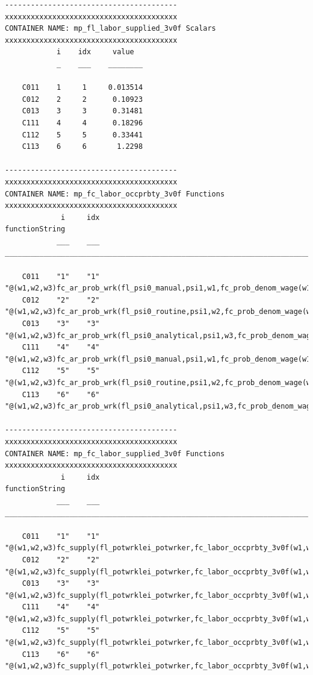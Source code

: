 \documentclass[
]{book}
\begin{document}
\begin{verbatim}
----------------------------------------
xxxxxxxxxxxxxxxxxxxxxxxxxxxxxxxxxxxxxxxx
CONTAINER NAME: mp_fl_labor_supplied_3v0f Scalars
xxxxxxxxxxxxxxxxxxxxxxxxxxxxxxxxxxxxxxxx
            i    idx     value  
            _    ___    ________

    C011    1     1     0.013514
    C012    2     2      0.10923
    C013    3     3      0.31481
    C111    4     4      0.18296
    C112    5     5      0.33441
    C113    6     6       1.2298

----------------------------------------
xxxxxxxxxxxxxxxxxxxxxxxxxxxxxxxxxxxxxxxx
CONTAINER NAME: mp_fc_labor_occprbty_3v0f Functions
xxxxxxxxxxxxxxxxxxxxxxxxxxxxxxxxxxxxxxxx
             i     idx                                       functionString                                   
            ___    ___    ____________________________________________________________________________________

    C011    "1"    "1"    "@(w1,w2,w3)fc_ar_prob_wrk(fl_psi0_manual,psi1,w1,fc_prob_denom_wage(w1,w2,w3))"    
    C012    "2"    "2"    "@(w1,w2,w3)fc_ar_prob_wrk(fl_psi0_routine,psi1,w2,fc_prob_denom_wage(w1,w2,w3))"   
    C013    "3"    "3"    "@(w1,w2,w3)fc_ar_prob_wrk(fl_psi0_analytical,psi1,w3,fc_prob_denom_wage(w1,w2,w3))"
    C111    "4"    "4"    "@(w1,w2,w3)fc_ar_prob_wrk(fl_psi0_manual,psi1,w1,fc_prob_denom_wage(w1,w2,w3))"    
    C112    "5"    "5"    "@(w1,w2,w3)fc_ar_prob_wrk(fl_psi0_routine,psi1,w2,fc_prob_denom_wage(w1,w2,w3))"   
    C113    "6"    "6"    "@(w1,w2,w3)fc_ar_prob_wrk(fl_psi0_analytical,psi1,w3,fc_prob_denom_wage(w1,w2,w3))"

----------------------------------------
xxxxxxxxxxxxxxxxxxxxxxxxxxxxxxxxxxxxxxxx
CONTAINER NAME: mp_fc_labor_supplied_3v0f Functions
xxxxxxxxxxxxxxxxxxxxxxxxxxxxxxxxxxxxxxxx
             i     idx                                    functionString                                
            ___    ___    ______________________________________________________________________________

    C011    "1"    "1"    "@(w1,w2,w3)fc_supply(fl_potwrklei_potwrker,fc_labor_occprbty_3v0f(w1,w2,w3))"
    C012    "2"    "2"    "@(w1,w2,w3)fc_supply(fl_potwrklei_potwrker,fc_labor_occprbty_3v0f(w1,w2,w3))"
    C013    "3"    "3"    "@(w1,w2,w3)fc_supply(fl_potwrklei_potwrker,fc_labor_occprbty_3v0f(w1,w2,w3))"
    C111    "4"    "4"    "@(w1,w2,w3)fc_supply(fl_potwrklei_potwrker,fc_labor_occprbty_3v0f(w1,w2,w3))"
    C112    "5"    "5"    "@(w1,w2,w3)fc_supply(fl_potwrklei_potwrker,fc_labor_occprbty_3v0f(w1,w2,w3))"
    C113    "6"    "6"    "@(w1,w2,w3)fc_supply(fl_potwrklei_potwrker,fc_labor_occprbty_3v0f(w1,w2,w3))"


\end{verbatim}
\end{document}
